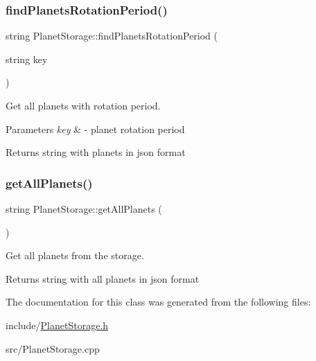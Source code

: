 \subsubsection{\texorpdfstring{find\+Planets\+Rotation\+Period()}{findPlanetsRotationPeriod()}}
{\footnotesize\ttfamily string Planet\+Storage\+::find\+Planets\+Rotation\+Period (\begin{DoxyParamCaption}\item[{string}]{key }\end{DoxyParamCaption})}



Get all planets with rotation period. 


\begin{DoxyParams}{Parameters}
{\em key} & -\/ planet rotation period \\
\hline
\end{DoxyParams}
\begin{DoxyReturn}{Returns}
string with planets in json format 
\end{DoxyReturn}
\mbox{\label{class_planet_storage_a828ae9655a5c71d38704baab36526796}} 
\subsubsection{\texorpdfstring{get\+All\+Planets()}{getAllPlanets()}}
{\footnotesize\ttfamily string Planet\+Storage\+::get\+All\+Planets (\begin{DoxyParamCaption}{ }\end{DoxyParamCaption})}



Get all planets from the storage. 

\begin{DoxyReturn}{Returns}
string with all planets in json format 
\end{DoxyReturn}


The documentation for this class was generated from the following files\+:\begin{DoxyCompactItemize}
\item 
include/\hyperlink{_planet_storage_8h}{Planet\+Storage.\+h}\item 
src/Planet\+Storage.\+cpp\end{DoxyCompactItemize}
